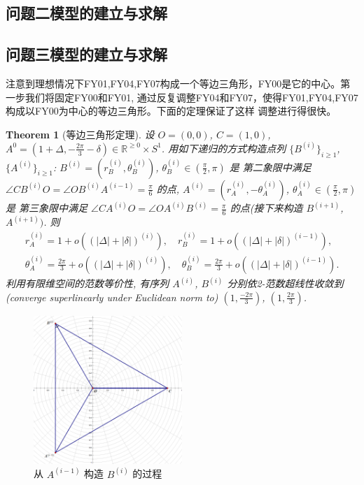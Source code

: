 \documentclass{my_paper}
\newcommand{\R}{\mathbb{R}}
\newtheorem{theorem}{Theorem}
\begin{document}
\subsection{问题二模型的建立与求解}

\subsection{问题三模型的建立与求解}
    注意到理想情况下FY01,FY04,FY07构成一个等边三角形，FY00是它的中心。第一步我们将固定FY00和FY01,
    通过反复调整FY04和FY07，使得FY01,FY04,FY07构成以FY00为中心的等边三角形。下面的定理保证了这样
    调整进行得很快。
\begin{theorem}[等边三角形定理]
\label{dbsjx} 
    设 $O=(0,0)$, $C=(1,0)$,   
    $A^{0}=(1+\Delta,-\frac{2\pi}3-\delta)\in \R^{\geq 0}\times S^1$. 用如下递归的方式构造点列
    $\{B^{(i)}\}_{i\geq 1}$, $\{A^{(i)}\}_{i\geq 1}$: 
    $B^{(i)}=(r_B^{(i)},\theta_B^{(i)})$, $\theta_{B}^{(i)}\in (\frac \pi 2,\pi)$ 是
    第二象限中满足 $\angle CB^{(i)}O=\angle OB^{(i)}A^{(i-1)}=\frac\pi6$ 的点, 
    $A^{(i)}=(r_A^{(i)},-\theta_A^{(i)})$, $\theta_{A}^{(i)}\in (\frac \pi 2,\pi)$ 是
    第三象限中满足 $\angle CA^{(i)}O=\angle OA^{(i)}B^{(i)}=\frac\pi6$ 的点(接下来构造 $B^{(i+1)}$, $A^{(i+1)})$. 
    则 
    \begin{equation}
    \begin{aligned}
        r_A^{(i)}=1+o((|\Delta|+|\delta|)^{(i)}),\quad r_B^{(i)}=1+o((|\Delta|+|\delta|)^{(i-1)}),
        \\
        \theta_A^{(i)}=\frac{2\pi}{3}+o((|\Delta|+|\delta|)^{(i)}),\quad \theta_B^{(i)}=\frac{2\pi}{3}+o((|\Delta|+|\delta|)^{(i-1)}).
    \end{aligned}
    \label{1}
    \end{equation}
    利用有限维空间的范数等价性, 有序列 $A^{(i)}$, $B^{(i)}$ 分别依2-范数超线性收敛到
    (converge superlinearly under Euclidean norm to) $(1,\frac{-2\pi}3)$, $(1,\frac{2\pi}3)$.
\end{theorem} 

\begin{figure}[h]
    \centering
    \includegraphics[width=0.5\textwidth]{sketch1}
    \caption{从 $A^{(i-1)}$ 构造 $B^{(i)}$ 的过程} 
\end{figure}
\end{document}
